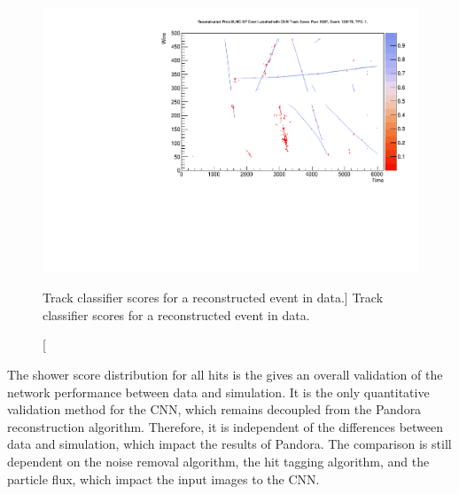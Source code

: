 \begin{figure}
	\centering
	\includegraphics[width=\textwidth]{figures/run5387_tpc1_view2_128178.pdf}
	\caption
	[Track classifier scores for a reconstructed event in \protodune{} data.]
	{Track classifier scores for a reconstructed event in \protodune{} data.}
	\label{fig:real_event}
\end{figure}

The shower score distribution for all hits is the gives an overall validation
of the network performance between data and simulation. It is the only
quantitative validation method for the CNN, which remains decoupled from the 
Pandora reconstruction algorithm. Therefore, it is independent of the 
differences between data and simulation, which impact the results of Pandora. 
The comparison is still dependent on the noise removal algorithm, the hit
tagging algorithm, and the particle flux, which impact the input images to the 
CNN.

